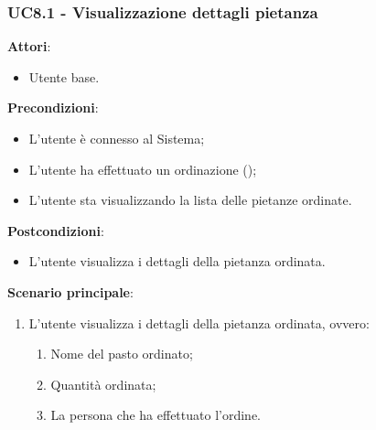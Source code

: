 \subsubsection{UC8.1 - Visualizzazione dettagli pietanza}\label{usecase:8_1}
\textbf{Attori}:
\begin{itemize}
    \item Utente base.
\end{itemize}
\textbf{Precondizioni}:
\begin{itemize}
    \item L'utente è connesso al Sistema;
    \item L'utente ha effettuato un ordinazione ();
    \item L'utente sta visualizzando la lista delle pietanze ordinate.
\end{itemize}
\textbf{Postcondizioni}:
\begin{itemize}
    \item L'utente visualizza i dettagli della pietanza ordinata.
\end{itemize}
\textbf{Scenario principale}:
\begin{enumerate}
    \item L'utente visualizza i dettagli della pietanza ordinata, ovvero:
    \begin{enumerate}
        \item Nome del pasto ordinato;
        \item Quantità ordinata;
        \item La persona che ha effettuato l'ordine.
    \end{enumerate}
\end{enumerate}
\newpage